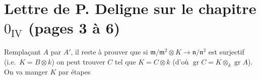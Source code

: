 \documentclass[11pt,a4paper]{article}
\begin{document}
\section{Lettre de P. Deligne sur le chapitre $0_{\mathrm{IV}}$ (pages 3 à 6)}

Remplaçant $A$ par $A'$, il reste à prouver que si $\mathfrak{m}/\mathfrak{m}^2 \otimes K \to \mathfrak{n}/\mathfrak{n}^2$
est surjectif (i.e.\ $K = B \otimes k$) on peut trouver $C$ tel que $K = C \otimes k$
(d'où $\operatorname{gr} C = K \otimes_k \operatorname{gr} A$). On va manger $K$ par étapes
\end{document}
